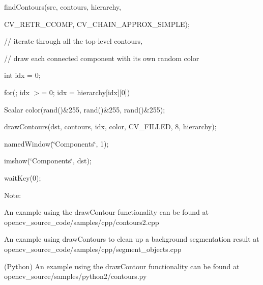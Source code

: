 {\ttfamily }

{\ttfamily find\+Contours(src, contours, hierarchy,}

{\ttfamily }

{\ttfamily }

{\ttfamily C\+V\+\_\+\+R\+E\+T\+R\+\_\+\+C\+C\+O\+MP, C\+V\+\_\+\+C\+H\+A\+I\+N\+\_\+\+A\+P\+P\+R\+O\+X\+\_\+\+S\+I\+M\+P\+LE);}

{\ttfamily }

{\ttfamily }

{\ttfamily // iterate through all the top-\/level contours,}

{\ttfamily }

{\ttfamily }

{\ttfamily // draw each connected component with its own random color}

{\ttfamily }

{\ttfamily }

{\ttfamily int idx = 0;}

{\ttfamily }

{\ttfamily }

{\ttfamily for(; idx $>$= 0; idx = hierarchy\mbox{[}idx\mbox{]}\mbox{[}0\mbox{]})}

{\ttfamily }

{\ttfamily }

{\ttfamily Scalar color(rand()\&255, rand()\&255, rand()\&255);}

{\ttfamily }

{\ttfamily }

{\ttfamily draw\+Contours(dst, contours, idx, color, C\+V\+\_\+\+F\+I\+L\+L\+E\+D, 8, hierarchy);}

{\ttfamily }

{\ttfamily }

{\ttfamily named\+Window(\char`\"{}\+Components\char`\"{}, 1);}

{\ttfamily }

{\ttfamily }

{\ttfamily imshow(\char`\"{}\+Components\char`\"{}, dst);}

{\ttfamily }

{\ttfamily }

{\ttfamily wait\+Key(0);}

{\ttfamily }

{\ttfamily }

{\ttfamily Note\+: }


\begin{DoxyItemize}
\item An example using the draw\+Contour functionality can be found at opencv\+\_\+source\+\_\+code/samples/cpp/contours2.\+cpp 
\item An example using draw\+Contours to clean up a background segmentation result at opencv\+\_\+source\+\_\+code/samples/cpp/segment\+\_\+objects.\+cpp 
\item (Python) An example using the draw\+Contour functionality can be found at opencv\+\_\+source/samples/python2/contours.\+py 
\end{DoxyItemize}


